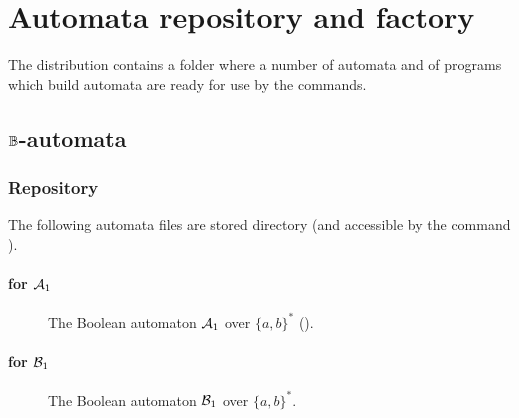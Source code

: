
\chapter{Automata repository and factory}
\label{chp:aut-rep-fac}

The \vcsnv distribution contains a folder
 where a number of automata and of \vcsn
programs which build automata are ready for use by the \tafkit
commands.

\section{$\mathbb{B}$-automata}

\subsection{Repository}

The following automata files are stored
 directory (and accessible by the command
).


\subsubsection{  for $\mathcal{A}_1$}

\begin{figure}[ht]
    \centering
    \caption{The Boolean automaton $\mathcal{A}_1$ over
    $\{a,b\}^{*}$ (\cf \protect{}). }
\label{fig:a1-app}
\end{figure}

\subsubsection{  for $\mathcal{B}_1$}

\begin{figure}[ht]
    \centering
    \caption{The Boolean automaton $\mathcal{B}_1$ over
    $\{a,b\}^{*}$. }
\label{fig:b1-app}
\end{figure}
\pagebreak
